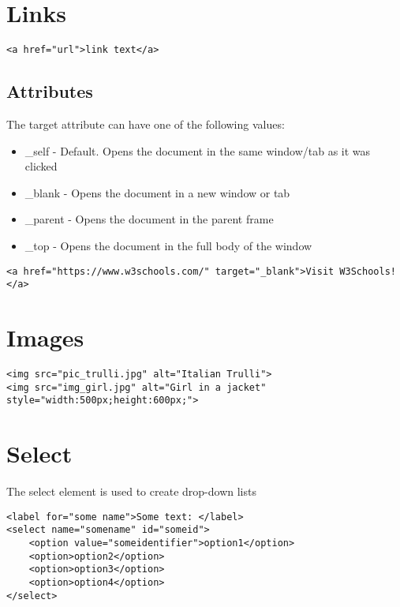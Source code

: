 \documentclass{report}
\begin{document}
    \pagebreak \bigbreak \noindent 
    \section{\LARGE Links}
    \bigbreak \noindent 
    \sepline
    \begin{verbatim}
<a href="url">link text</a>
    \end{verbatim}
    \sepline
    \bigbreak \noindent 
    \subsection{Attributes}
    \bigbreak \noindent 
    The target attribute can have one of the following values:
    \begin{itemize}
        \item \_self - Default. Opens the document in the same window/tab as it was clicked
        \item \_blank - Opens the document in a new window or tab
        \item \_parent - Opens the document in the parent frame
        \item \_top - Opens the document in the full body of the window
    \end{itemize}
    \bigbreak \noindent 
    \sepline
    \begin{verbatim}
<a href="https://www.w3schools.com/" target="_blank">Visit W3Schools!</a>
    \end{verbatim}
    \sepline

    \bigbreak \noindent 
    \section{\LARGE Images }
    \bigbreak \noindent 
    \sepline
    \begin{verbatim}
<img src="pic_trulli.jpg" alt="Italian Trulli">
<img src="img_girl.jpg" alt="Girl in a jacket" style="width:500px;height:600px;">
    \end{verbatim}
    \sepline

    \bigbreak \noindent 
    \section{\LARGE Select}
    \bigbreak \noindent 
    The select element is used to create drop-down lists
    \bigbreak \noindent 
    \sepline
    \begin{verbatim}
<label for="some name">Some text: </label>
<select name="somename" id="someid">
    <option value="someidentifier">option1</option>
    <option>option2</option>
    <option>option3</option>
    <option>option4</option>
</select>
    \end{verbatim}
    \sepline
\end{document}
